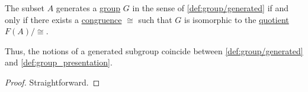 \begin{proposition}\label{thm:group_presentation_generating_set}
  The subset \( A \) generates a \hyperref[def:group]{group} \( G \) in the sense of \cref{def:group/generated} if and only if there exists a \hyperref[def:first_order_congruence]{congruence} \( {\cong} \) such that \( G \) is isomorphic to the \hyperref[def:group/quotient]{quotient} \( F(A) / {\cong} \).
\end{proposition}
\begin{comments}
  \item Thus, the notions of a generated subgroup coincide between \cref{def:group/generated} and \cref{def:group_presentation}.
\end{comments}
\begin{proof}
  Straightforward.
\end{proof}


